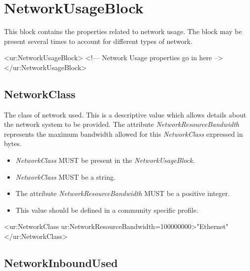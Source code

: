 
\section{NetworkUsageBlock}

This block contains the properties related to network usage. The block may be present several times to account for different types of network.

\begin{XMLexample}
<ur:NetworkUsageBlock>
<!— Network Usage properties go in here -->
</ur:NetworkUsageBlock>
\end{XMLexample}






\subsection{NetworkClass}

The class of network used.
This is a descriptive value which allows details about the network system to be provided. The attribute \emph{NetworkResourceBandwidth} represents the maximum bandwidth allowed for this \emph{NetworkClass} expressed in bytes.

\begin{itemize}
\item \emph{NetworkClass} MUST be present in the \emph{NetworkUsageBlock}.
\item \emph{NetworkClass} MUST be a string.
\item The attribute \emph{NetworkResourceBandwidth} MUST be a positive  integer.
\item This value should be defined in a community specific profile.
\end{itemize}

\begin{XMLexample}
<ur:NetworkClass ur:NetworkResourceBandwidth=100000000>"Ethernet"</ur:NetworkClass>
\end{XMLexample}






\subsection{NetworkInboundUsed}

